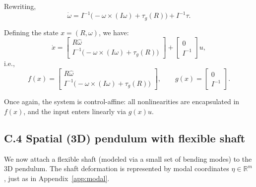 \documentclass[12pt]{article}
\begin{document}
Rewriting,
\begin{equation}
  \dot{\omega}
  =
  I^{-1}\big( -\omega \times (I\omega) + \tau_g(R) \big)
  +
  I^{-1} \tau.
\end{equation}

Defining the state \(x = (R,\omega)\), we have:
\[
  \dot{x} =
  \begin{bmatrix}
    R \hat{\omega} \\
    I^{-1}\big( -\omega \times (I\omega) + \tau_g(R) \big)
  \end{bmatrix}
  +
  \begin{bmatrix}
    0 \\
    I^{-1}
  \end{bmatrix} u,
\]
i.e.,
\[
  f(x) =
  \begin{bmatrix}
    R \hat{\omega} \\
    I^{-1}\big( -\omega \times (I\omega) + \tau_g(R) \big)
  \end{bmatrix},
  \qquad
  g(x) =
  \begin{bmatrix}
    0 \\
    I^{-1}
  \end{bmatrix}.
\]

Once again, the system is control-affine: all nonlinearities are encapsulated in \(f(x)\), and the input enters linearly via \(g(x)u\).

\subsection{C.4 \quad Spatial (3D) pendulum with flexible shaft}

We now attach a flexible shaft (modeled via a small set of bending modes) to the 3D pendulum. The shaft deformation is represented by modal coordinates \(\eta \in \mathbb{R}^m\), just as in Appendix~\ref{app:modal}.
\end{document}
